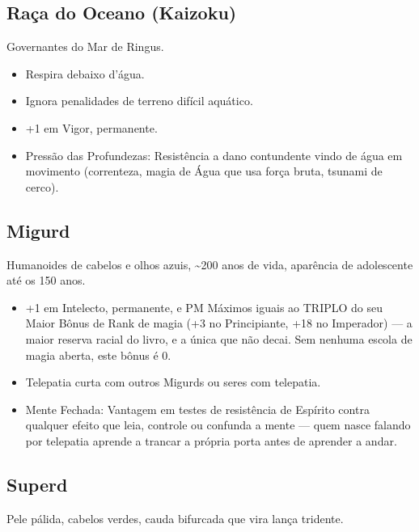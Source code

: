 \subsection{Raça do Oceano (Kaizoku)}
Governantes do Mar de Ringus.

\begin{itemize}
  \item Respira debaixo d'água.
  \item Ignora penalidades de terreno difícil aquático.
  \item +1 em Vigor, permanente.
  \item Pressão das Profundezas: Resistência a dano contundente vindo de água em movimento (correnteza, magia de Água que usa força bruta, tsunami de cerco).
\end{itemize}

\subsection{Migurd}
Humanoides de cabelos e olhos azuis, \textasciitilde{}200 anos de vida, aparência de adolescente até os 150 anos.

\begin{itemize}
  \item +1 em Intelecto, permanente, e PM Máximos iguais ao TRIPLO do seu Maior Bônus de Rank de magia (+3 no Principiante, +18 no Imperador) --- a maior reserva racial do livro, e a única que não decai. Sem nenhuma escola de magia aberta, este bônus é 0.
  \item Telepatia curta com outros Migurds ou seres com telepatia.
  \item Mente Fechada: Vantagem em testes de resistência de Espírito contra qualquer efeito que leia, controle ou confunda a mente --- quem nasce falando por telepatia aprende a trancar a própria porta antes de aprender a andar.
\end{itemize}

\subsection{Superd}
Pele pálida, cabelos verdes, cauda bifurcada que vira lança tridente.

